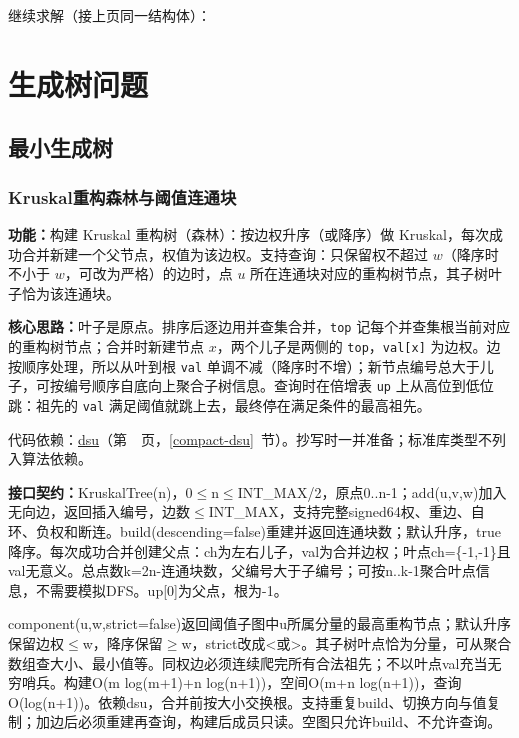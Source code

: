 \Needspace{281pt}



\newpage

\noindent 继续求解（接上页同一结构体）：



\Needspace{180pt}

\chapter{生成树问题}

\section{最小生成树}

\subsection{Kruskal重构森林与阈值连通块}\label{compact-KruskalTree}

\noindent\textbf{功能：}\allowbreak 构建 Kruskal 重构树（森林）：按边权升序（或降序）做 Kruskal，每次成功合并新建一个父节点，权值为该边权。支持查询：只保留权不超过 $w$（降序时不小于 $w$，可改为严格）的边时，点 $u$ 所在连通块对应的重构树节点，其子树叶子恰为该连通块。

\textbf{核心思路：}\allowbreak 叶子是原点。排序后逐边用并查集合并，\texttt{top} 记每个并查集根当前对应的重构树节点；合并时新建节点 $x$，两个儿子是两侧的 \texttt{top}，\texttt{val[x]} 为边权。边按顺序处理，所以从叶到根 \texttt{val} 单调不减（降序时不增）；新节点编号总大于儿子，可按编号顺序自底向上聚合子树信息。查询时在倍增表 \texttt{up} 上从高位到低位跳：祖先的 \texttt{val} 满足阈值就跳上去，最终停在满足条件的最高祖先。

代码依赖：\hyperref[compact-dsu]{dsu}（第~\pageref{compact-dsu}~页，\ref{compact-dsu}~节）。抄写时一并准备；标准库类型不列入算法依赖。

{\sloppy{}\noindent\textbf{接口契约：}KruskalTree(n)，0$\le$n$\le$INT\_MAX/2，原点0..n-1；add(u,v,w)加入无向边，返回插入编号，边数$\le$INT\_MAX，支持完整signed64权、重边、自环、负权和断连。build(descending=false)重建并返回连通块数；默认升序，true降序。每次成功合并创建父点：ch为左右儿子，val为合并边权；叶点ch=\{-1,-1\}且val无意义。总点数k=2n-连通块数，父编号大于子编号；可按n..k-1聚合叶点信息，不需要模拟DFS。up[0]为父点，根为-1。

component(u,w,strict=false)返回阈值子图中u所属分量的最高重构节点；默认升序保留边权$\le$w，降序保留$\ge$w，strict改成<或>。其子树叶点恰为分量，可从聚合数组查大小、最小值等。同权边必须连续爬完所有合法祖先；不以叶点val充当无穷哨兵。构建O(m log(m+1)+n log(n+1))，空间O(m+n log(n+1))，查询O(log(n+1))。依赖dsu，合并前按大小交换根。支持重复build、切换方向与值复制；加边后必须重建再查询，构建后成员只读。空图只允许build、不允许查询。\par}


